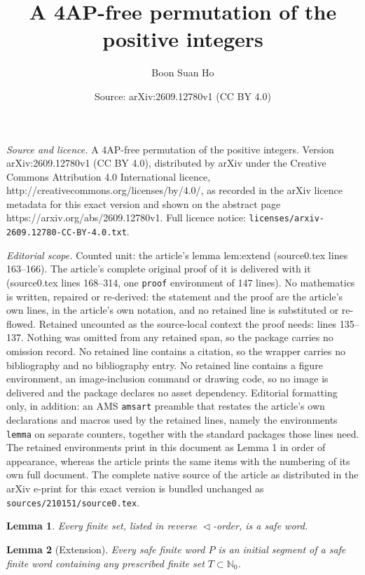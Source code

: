 \documentclass[10pt,a4paper]{amsart}
\title{A 4AP-free permutation of the positive integers}
\author{Boon Suan Ho}
\date{Source: arXiv:2609.12780v1 (CC BY 4.0)}
\newtheorem{lemma}{Lemma}
\newcommand{\NN}{\mathbb N}
\newcommand{\bits}{\mathrel{\triangleleft}}
\begin{document}
\maketitle

\noindent\emph{Source and licence.} A 4AP-free permutation of the positive integers. Version arXiv:2609.12780v1 (CC BY 4.0), distributed by arXiv under the Creative Commons Attribution 4.0 International licence, http://creativecommons.org/licenses/by/4.0/, as recorded in the arXiv licence metadata for this exact version and shown on the abstract page https://arxiv.org/abs/2609.12780v1. Full licence notice: \texttt{licenses/arxiv-2609.12780-CC-BY-4.0.txt}.\par\smallskip

\noindent\textit{Editorial scope.} Counted unit: the article's lemma lem:extend (source0.tex lines 163--166). The article's complete original proof of it is delivered with it (source0.tex lines 168--314, one \texttt{proof} environment of 147 lines). No mathematics is written, repaired or re-derived: the statement and the proof are the article's own lines, in the article's own notation, and no retained line is substituted or re-flowed.  Retained uncounted as the source-local context the proof needs: lines 135--137.  Nothing was omitted from any retained span, so the package carries no omission record.  No retained line contains a citation, so the wrapper carries no bibliography and no bibliography entry.  No retained line contains a figure environment, an image-inclusion command or drawing code, so no image is delivered and the package declares no asset dependency.  Editorial formatting only, in addition: an AMS \texttt{amsart} preamble that restates the article's own declarations and macros used by the retained lines, namely the environments \texttt{lemma} on separate counters, together with the standard packages those lines need.  The retained environments print in this document as Lemma 1 in order of appearance, whereas the article prints the same items with the numbering of its own full document.  The complete native source of the article as distributed in the arXiv e-print for this exact version is bundled unchanged as \texttt{sources/210151/source0.tex}.
\begin{lemma}\label{lem:base}
Every finite set, listed in reverse $\bits$-order, is a safe word.
\end{lemma}

\begin{lemma}[Extension]\label{lem:extend}
Every safe finite word $P$ is an initial segment of a safe finite word
containing any prescribed finite set $T\subset\NN_0$.
\end{lemma}
\end{document}
